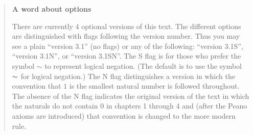 \documentclass[dvips,12pt,twoside]{book}
\begin{document}
\vfill


\begin{quote}
{\Large \bf A word about options} 

There are currently 4 optional versions of this text.  The different options are distinguished with
flags following the version number.  Thus you may see a plain ``version  3.1'' (no flags) 
or any of the following: ``version 3.1S'', ``version 3.1N'',  or ``version 3.1SN''. 
The S flag is for those who prefer the symbol $\sim$ to represent 
logical negation.  (The default is to
use the symbol $\savedlnot$ for logical negation.)  The N flag distinguishes a version in which
the convention that $1$ is the smallest natural number is followed throughout.  The absence
of the N flag indicates the original version of the text in which the naturals do not contain $0$
in chapters 1 through 4 and (after the Peano axioms are introduced) that convention is changed
to the more modern rule. 

\end{quote}


\vfill
\clearpage

\tableofcontents

\listoffigures

\listoftables




\mainmatter













{}%


%

{}
\printindex
\end{document}

